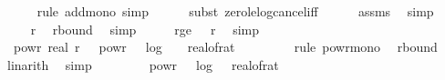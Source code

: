 \begin{isabellebody}
\ \ \ \ \isamarkupfalse%
\ {\isacharparenleft}{\kern0pt}rule\ add{\isacharunderscore}{\kern0pt}mono{\isacharcomma}{\kern0pt}\ simp{\isacharparenright}{\kern0pt}\isanewline
\ \ \ \ \isamarkupfalse%
\ {\isacharparenleft}{\kern0pt}subst\ zero{\isacharunderscore}{\kern0pt}le{\isacharunderscore}{\kern0pt}log{\isacharunderscore}{\kern0pt}cancel{\isacharunderscore}{\kern0pt}iff{\isacharparenright}{\kern0pt}\isanewline
\ \ \ \ \isamarkupfalse%
\ assms\ \isamarkupfalse%
\ simp{\isacharplus}{\kern0pt}\isanewline
\ \ \isamarkupfalse%
\ \isamarkupfalse%
\ {\isachardoublequoteopen}{\isachardot}{\kern0pt}{\isachardot}{\kern0pt}{\isachardot}{\kern0pt}\ {\isasymle}\ r{\isachardoublequoteclose}\ \isamarkupfalse%
\ r{\isacharunderscore}{\kern0pt}bound\ \isamarkupfalse%
\ simp\isanewline
\ \ \isamarkupfalse%
\ \isamarkupfalse%
\ r{\isacharunderscore}{\kern0pt}ge{\isacharunderscore}{\kern0pt}{}{\isacharcolon}{\kern0pt}\ {\isachardoublequoteopen}{}\ {\isasymle}\ r{\isachardoublequoteclose}\ \isamarkupfalse%
\ simp\isanewline
\isanewline
\ \ \isamarkupfalse%
\ {\isachardoublequoteopen}{}\ powr\ {\isacharparenleft}{\kern0pt}{\isacharminus}{\kern0pt}real\ r{\isacharparenright}{\kern0pt}\ {\isasymle}\ {}\ powr\ {\isacharparenleft}{\kern0pt}{\isacharminus}{\kern0pt}{\isacharparenleft}{\kern0pt}{}\ {\isacharasterisk}{\kern0pt}\ log\ {}\ {\isacharparenleft}{\kern0pt}{}\ {\isacharslash}{\kern0pt}\ real{\isacharunderscore}{\kern0pt}of{\isacharunderscore}{\kern0pt}rat\ {\isasymdelta}{\isacharparenright}{\kern0pt}\ {\isacharplus}{\kern0pt}\ {}{}{\isacharparenright}{\kern0pt}{\isacharparenright}{\kern0pt}{\isachardoublequoteclose}\isanewline
\ \ \ \ \isamarkupfalse%
\ {\isacharparenleft}{\kern0pt}rule\ powr{\isacharunderscore}{\kern0pt}mono{\isacharparenright}{\kern0pt}\ \isamarkupfalse%
\ r{\isacharunderscore}{\kern0pt}bound\ \isamarkupfalse%
\ linarith\ \isamarkupfalse%
\ simp\isanewline
\ \ \isamarkupfalse%
\ \isamarkupfalse%
\ {\isachardoublequoteopen}{\isachardot}{\kern0pt}{\isachardot}{\kern0pt}{\isachardot}{\kern0pt}\ {\isacharequal}{\kern0pt}\ {}\ powr\ {\isacharparenleft}{\kern0pt}{\isacharminus}{\kern0pt}{}\ {\isacharasterisk}{\kern0pt}\ log\ {}\ {\isacharparenleft}{\kern0pt}{}\ {\isacharslash}{\kern0pt}real{\isacharunderscore}{\kern0pt}of{\isacharunderscore}{\kern0pt}rat\ {\isasymdelta}{\isacharparenright}{\kern0pt}\ {\isacharminus}{\kern0pt}{}{}{\isacharparenright}{\kern0pt}{\isachardoublequoteclose}\isanewline

\end{isabellebody}
